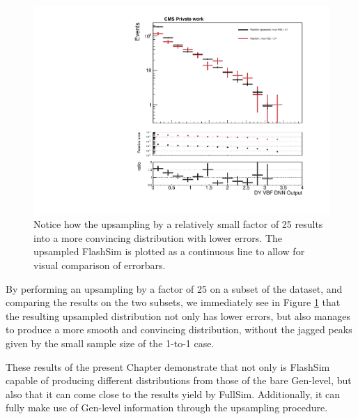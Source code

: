           \begin{figure}
    \centering
    \includegraphics[width=\linewidth]{gfx/ch6/DY2Jets_DNN18Atan____log_upsampled.pdf}
    \caption[Upsampling on DY]{Notice how the upsampling by a relatively small factor of 25 results into a more convincing distribution with lower errors. The upsampled FlashSim is plotted as a continuous line to allow for visual comparison of errorbars.}
    \label{fig:updnnDY}
   \end{figure}
   
   By performing an upsampling by a factor of 25 on a subset of the dataset, and comparing the results on the two subsets, we immediately see in Figure \ref{fig:updnnDY} that the resulting upsampled distribution not only has lower errors, but also manages to produce a more smooth and convincing distribution, without the jagged peaks given by the small sample size of the 1-to-1 case.
   
  These results of the present Chapter demonstrate that not only is FlashSim capable of producing different distributions from those of the bare Gen-level, but also that it can come close to the results yield by FullSim. Additionally, it can fully make use of Gen-level information through the upsampling procedure.